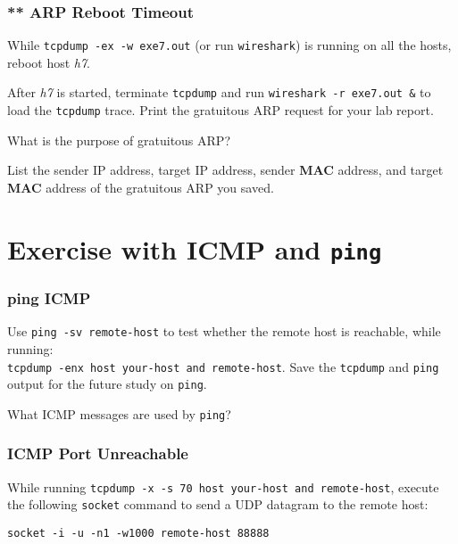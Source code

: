 \documentclass{../UTNetLab}
\begin{document}
\section{** ARP Reboot Timeout}
    While \lstinline{tcpdump -ex -w exe7.out} (or run \lstinline{wireshark}) is running on all the hosts, reboot host \textit{h7}. 

    After \textit{h7} is started, terminate \lstinline{tcpdump} and run \lstinline{wireshark -r exe7.out &} to load the \lstinline{tcpdump} trace.
    Print the gratuitous ARP request for your lab report.
    
    \begin{report}
    \item What is the purpose of gratuitous ARP?

    \item List the sender IP address, target IP address, sender \textbf{MAC} address, and target \textbf{MAC} address of the gratuitous ARP you saved.
    \end{report}


\part{Exercise with ICMP and \texttt{ping}}
\section{ping ICMP}
    Use \lstinline[emph={remote-host}]{ping -sv remote-host} to test whether the remote host is reachable, while running:
    \\\lstinline[emph={your-host, remote-host}]{tcpdump -enx host your-host and remote-host}.
    Save the \lstinline{tcpdump} and \lstinline{ping} output for the future study on \lstinline{ping}.
    
    \begin{report}
    \item What ICMP messages are used by \lstinline{ping}?
    \end{report}

\section{ICMP Port Unreachable}
    While running \lstinline[emph={your-host, remote-host}]{tcpdump -x -s 70 host your-host and remote-host}, execute the following \lstinline{socket} command to send a UDP datagram to the remote host:

    \begin{lstlisting}[emph={your-host, remote-host}]
socket -i -u -n1 -w1000 remote-host 88888
    \end{lstlisting}
\end{document}
